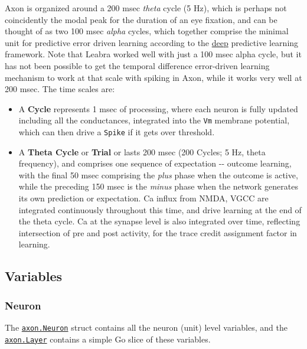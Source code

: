 \documentclass[11pt,twoside]{article}
\newif\myifpdf
\begin{document}
Axon is organized around a 200 msec \emph{theta} cycle (5 Hz), which is
perhaps not coincidently the modal peak for the duration of an eye
fixation, and can be thought of as two 100 msec \emph{alpha} cycles,
which together comprise the minimal unit for predictive error driven
learning according to the
\href{https://github.com/emer/axon/blob/master/deep}{deep} predictive
learning framework. Note that Leabra worked well with just a 100 msec
alpha cycle, but it has not been possible to get the temporal difference
error-driven learning mechanism to work at that scale with spiking in
Axon, while it works very well at 200 msec. The time scales are:

\begin{itemize}
\item
  A \textbf{Cycle} represents 1 msec of processing, where each neuron is
  fully updated including all the conductances, integrated into the
  \texttt{Vm} membrane potential, which can then drive a \texttt{Spike}
  if it gets over threshold.
\item
  A \textbf{Theta Cycle} or \textbf{Trial} or lasts 200 msec (200
  Cycles; 5 Hz, theta frequency), and comprises one sequence of
  expectation -\/- outcome learning, with the final 50 msec comprising
  the \emph{plus} phase when the outcome is active, while the preceding
  150 msec is the \emph{minus} phase when the network generates its own
  prediction or expectation. Ca influx from NMDA, VGCC are integrated
  continuously throughout this time, and drive learning at the end of
  the theta cycle. Ca at the synapse level is also integrated over time,
  reflecting intersection of pre and post activity, for the trace credit
  assignment factor in learning.
\end{itemize}

\hypertarget{variables}{%
\subsection{Variables}\label{variables}}

\hypertarget{neuron}{%
\subsubsection{Neuron}\label{neuron}}

The
\href{https://github.com/emer/axon/blob/master/axon/neuron.go}{\texttt{axon.Neuron}}
struct contains all the neuron (unit) level variables, and the
\href{https://github.com/emer/axon/blob/master/axon/layer.go}{\texttt{axon.Layer}}
contains a simple Go slice of these variables.
\end{document}
